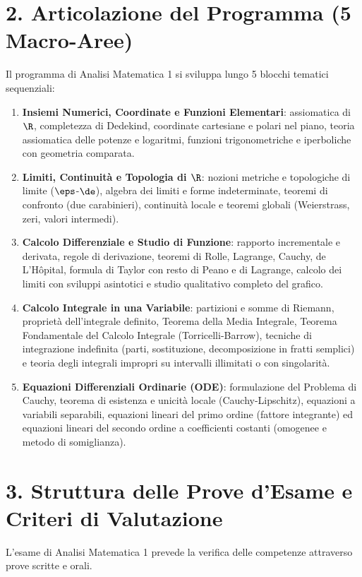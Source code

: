 \documentclass[11pt,a4paper,twoside,openright]{book}
\begin{document}
\section*{2. Articolazione del Programma (5 Macro-Aree)}
Il programma di Analisi Matematica 1 si sviluppa lungo 5 blocchi tematici sequenziali:
\begin{enumerate}
    \item \textbf{Insiemi Numerici, Coordinate e Funzioni Elementari}: assiomatica di $\R$, completezza di Dedekind, coordinate cartesiane e polari nel piano, teoria assiomatica delle potenze e logaritmi, funzioni trigonometriche e iperboliche con geometria comparata.
    \item \textbf{Limiti, Continuità e Topologia di $\R$}: nozioni metriche e topologiche di limite ($\eps$-$\de$), algebra dei limiti e forme indeterminate, teoremi di confronto (due carabinieri), continuità locale e teoremi globali (Weierstrass, zeri, valori intermedi).
    \item \textbf{Calcolo Differenziale e Studio di Funzione}: rapporto incrementale e derivata, regole di derivazione, teoremi di Rolle, Lagrange, Cauchy, de L'Hôpital, formula di Taylor con resto di Peano e di Lagrange, calcolo dei limiti con sviluppi asintotici e studio qualitativo completo del grafico.
    \item \textbf{Calcolo Integrale in una Variabile}: partizioni e somme di Riemann, proprietà dell'integrale definito, Teorema della Media Integrale, Teorema Fondamentale del Calcolo Integrale (Torricelli-Barrow), tecniche di integrazione indefinita (parti, sostituzione, decomposizione in fratti semplici) e teoria degli integrali impropri su intervalli illimitati o con singolarità.
    \item \textbf{Equazioni Differenziali Ordinarie (ODE)}: formulazione del Problema di Cauchy, teorema di esistenza e unicità locale (Cauchy-Lipschitz), equazioni a variabili separabili, equazioni lineari del primo ordine (fattore integrante) ed equazioni lineari del secondo ordine a coefficienti costanti (omogenee e metodo di somiglianza).
\end{enumerate}

\section*{3. Struttura delle Prove d'Esame e Criteri di Valutazione}
L'esame di Analisi Matematica 1 prevede la verifica delle competenze attraverso prove scritte e orali.
\end{document}

